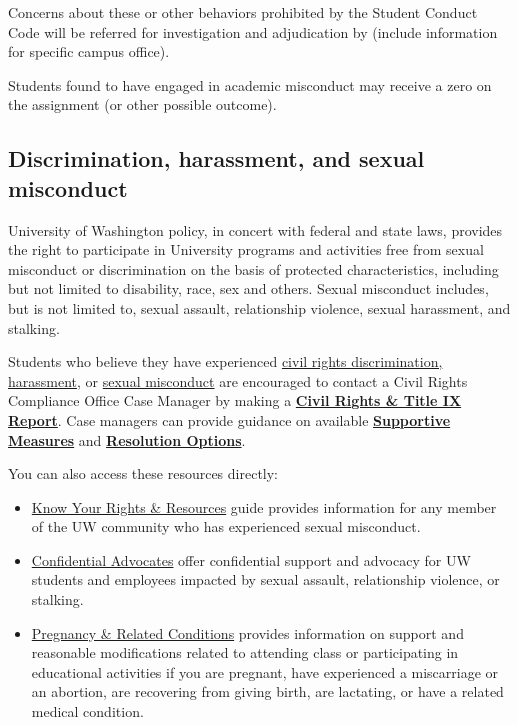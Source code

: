 \documentclass[12pt, letterpaper]{article}
\begin{document}
Concerns about these or other behaviors prohibited by the Student Conduct Code will be referred for investigation and adjudication by (include information for specific campus office).

Students found to have engaged in academic misconduct may receive a zero on the assignment (or other possible outcome).

\subsection*{Discrimination, harassment, and sexual misconduct}	\label{sec:title_ix}

University of Washington policy, in concert with federal and state laws, provides the right to participate in University programs and activities free from sexual misconduct or discrimination on the basis of protected characteristics, including but not limited to disability, race, sex and others. Sexual misconduct includes, but is not limited to, sexual assault, relationship violence, sexual harassment, and stalking.

Students who believe they have experienced \href{https://www.washington.edu/civilrights/seeking-support/civil-rights-discrimination/}{civil rights discrimination, harassment}, or \href{https://www.washington.edu/civilrights/seeking-support/sexual-misconduct/}{sexual misconduct} are encouraged to contact a Civil Rights Compliance Office Case Manager by making a \href{https://www.washington.edu/civilrights/making-a-report/make-a-report/}{\textbf{Civil Rights \& Title IX Report}}. Case managers can provide guidance on available \href{https://www.washington.edu/civilrights/seeking-support/supportive-measures/}{\textbf{Supportive Measures}} and \href{https://www.washington.edu/civilrights/resolution-options/resolution-options-overview/}{\textbf{Resolution Options}}.

You can also access these resources directly:
\begin{itemize}
    \item \href{https://www.washington.edu/civilrights/seeking-support/sexual-misconduct/#kyrr}{Know Your Rights \& Resources} guide provides information for any member of the UW community who has experienced sexual misconduct.
    \item \href{https://www.washington.edu/sexualassault/support/advocacy/}{Confidential Advocates} offer confidential support and advocacy for UW students and employees impacted by sexual assault, relationship violence, or stalking.
    \item \href{https://www.washington.edu/civilrights/seeking-support/pregnancy-and-related-conditions/}{Pregnancy \& Related Conditions} provides information on support and reasonable modifications related to attending class or participating in educational activities if you are pregnant, have experienced a miscarriage or an abortion, are recovering from giving birth, are lactating, or have a related medical condition.
\end{itemize}
\end{document}
